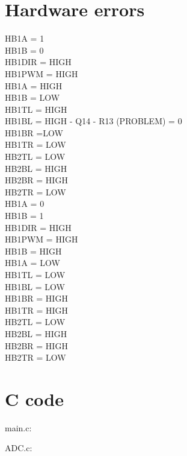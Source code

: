 \section{Hardware errors}
HB1A = 1 \\
HB1B = 0\\

HB1DIR = HIGH\\
HB1PWM = HIGH\\
HB1A = HIGH\\
HB1B = LOW\\

HB1TL = HIGH\\
HB1BL = HIGH - Q14 - R13 (PROBLEM) = 0\\
HB1BR =LOW\\
HB1TR = LOW\\

HB2TL = LOW\\
HB2BL = HIGH\\
HB2BR = HIGH\\
HB2TR = LOW\\

HB1A = 0\\
HB1B = 1\\

HB1DIR = HIGH\\
HB1PWM = HIGH\\
HB1B = HIGH\\
HB1A = LOW\\

HB1TL = LOW\\
HB1BL = LOW\\
HB1BR = HIGH \\
HB1TR = HIGH\\

HB2TL = LOW\\
HB2BL = HIGH\\
HB2BR = HIGH\\
HB2TR = LOW\\
\section{C code}
main.c:

\newpage
ADC.c:
